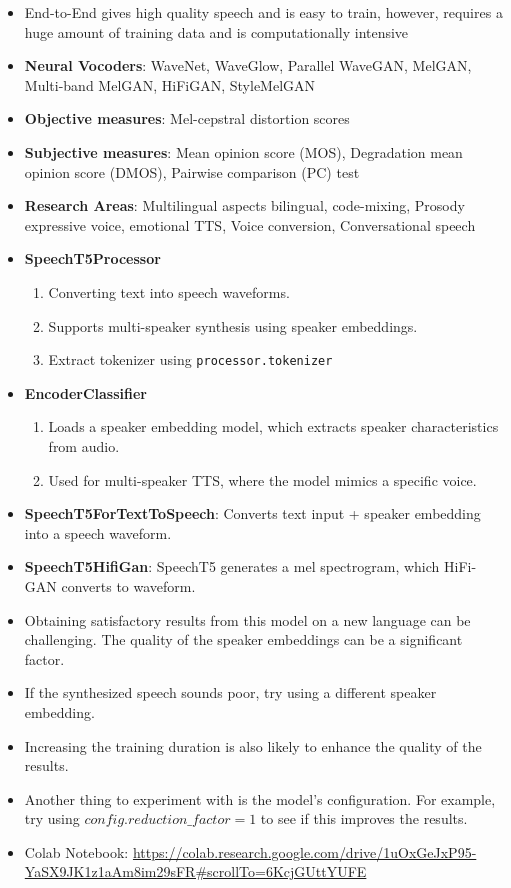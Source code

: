 \documentclass[a4paper]{article}
\begin{document}
\begin{itemize}
    \item End-to-End gives high quality speech and is easy to train, however, requires a huge amount of training data and is computationally intensive
    \item \textbf{Neural Vocoders}: WaveNet, WaveGlow, Parallel WaveGAN, MelGAN, Multi-band MelGAN, HiFiGAN, StyleMelGAN
    \item \textbf{Objective measures}: Mel-cepstral distortion scores
    \item \textbf{Subjective measures}: Mean opinion score (MOS), Degradation mean opinion score (DMOS), Pairwise comparison (PC) test
    \item \textbf{Research Areas}: Multilingual aspects bilingual, code-mixing,  Prosody expressive voice, emotional TTS, Voice conversion, Conversational speech
    \item \textbf{SpeechT5Processor}
    \begin{enumerate}
        \item Converting text into speech waveforms.
        \item Supports multi-speaker synthesis using speaker embeddings.
        \item Extract tokenizer using \verb|processor.tokenizer|
    \end{enumerate}
    \item \textbf{EncoderClassifier}
    \begin{enumerate}
        \item Loads a speaker embedding model, which extracts speaker characteristics from audio.
        \item Used for multi-speaker TTS, where the model mimics a specific voice.
    \end{enumerate}
    \item \textbf{SpeechT5ForTextToSpeech}: Converts text input + speaker embedding into a speech waveform.
    \item \textbf{SpeechT5HifiGan}: SpeechT5 generates a mel spectrogram, which HiFi-GAN converts to waveform.
    \item Obtaining satisfactory results from this model on a new language can be challenging. The quality of the speaker embeddings can be a significant factor.
    \item If the synthesized speech sounds poor, try using a different speaker embedding.
    \item Increasing the training duration is also likely to enhance the quality of the results.
    \item Another thing to experiment with is the model’s configuration. For example, try using $config.reduction\_factor = 1$ to see if this improves the results.
    \item Colab Notebook: \url{https://colab.research.google.com/drive/1uOxGeJxP95-YaSX9JK1z1aAm8im29sFR#scrollTo=6KcjGUttYUFE}
\end{itemize}
\end{document}

